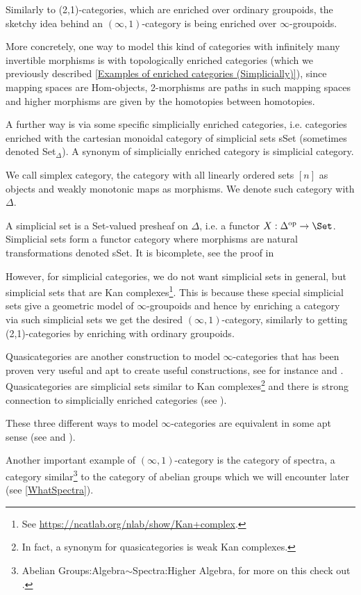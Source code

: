 \begin{ex}
    Similarly to (2,1)-categories, which are enriched over ordinary groupoids, the sketchy idea
    behind an $(\infty,1)$-category is being enriched over $\infty$-groupoids.
    
    More concretely, one way to model this kind of categories with infinitely many invertible morphisms is with topologically enriched categories (which we previously described \ref{Examples of enriched categories (Simplicially)}), since mapping spaces are Hom-objects, 2-morphisms are paths 
    in such mapping spaces and higher morphisms are given by the homotopies between homotopies. 
    
    A further way is via some specific simplicially enriched categories, i.e. categories enriched with the
     cartesian monoidal category of simplicial sets sSet (sometimes denoted Set$_\Delta$). A synonym
     of simplicially enriched category is simplicial category. 
\end{ex}
\begin{defn}
    We call simplex category, the category with all linearly ordered sets $[n]$ as objects and weakly
     monotonic maps as morphisms. We denote such category with $\Delta$.
\end{defn}
\begin{defn}
    A simplicial set is a Set-valued presheaf on $\Delta$, i.e. a functor 
    $X:\Delta^{\operatorname{op}}\to \Set$. Simplicial sets form a functor category where morphisms are
     natural transformations denoted
     sSet. It is bicomplete, see the proof in \cite[1.1.24]{land2021introduction}
\end{defn}
However, for simplicial categories,
 we do not want simplicial sets in general, but simplicial sets that are Kan
 complexes\footnote{See \url{https://ncatlab.org/nlab/show/Kan+complex}.}. This is because these special simplicial sets give a geometric model of $\infty$-groupoids and hence by enriching a category via such simplicial sets we get the desired $(\infty,1)$-category, similarly to getting (2,1)-categories by enriching with ordinary groupoids.

Quasicategories are another construction to model $\infty$-categories that has been proven very
 useful and apt to create useful constructions, see for instance \cite{lurie2008higher} and
  \cite{Luriealgebra}. Quasicategories are simplicial sets similar to Kan complexes\footnote{In fact, a 
  synonym for quasicategories is weak Kan complexes.} and there is strong connection to
   simplicially enriched categories (see \cite{land2021introduction}).

These three different ways to model $\infty$-categories are equivalent in some apt sense (see
 \cite{LurieGoodwillieEquivalent} and \cite{bergner2006survey}).

\begin{rem}
    Another important example of $(\infty,1)$-category is the category of spectra, a category
     similar\footnote{Abelian Groups:Algebra$\sim$Spectra:Higher Algebra, for more on this check out \cite{Mazel-Gee2024}.} to the category of abelian groups which we will encounter later (see
     \ref{WhatSpectra}).
\end{rem} 